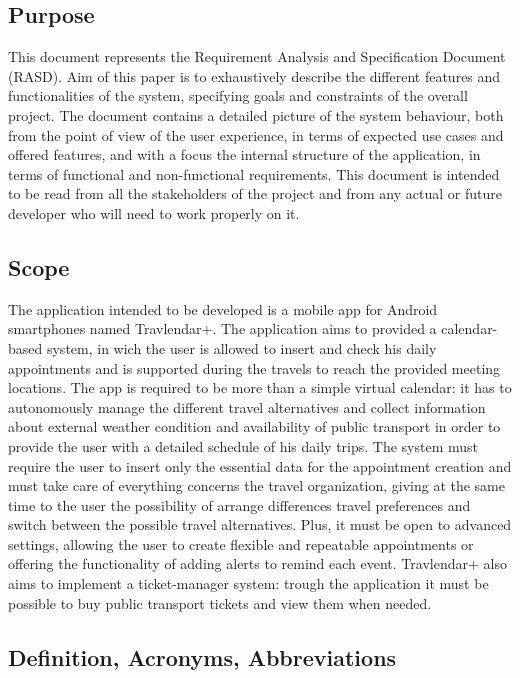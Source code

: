 \subsection{Purpose}
This document represents the Requirement Analysis and Specification Document (RASD). Aim of this paper is to exhaustively describe the different features and functionalities of the system, specifying goals and constraints of the overall project. The document contains a detailed picture of the system behaviour, both from the point of view of the user experience, in terms of expected use cases and offered features, and with a focus the internal structure of the application, in terms of functional and non-functional requirements.
This document is intended to be read from all the stakeholders of the project and from any actual or future developer who will need to work properly on it.

\subsection{Scope}
The application intended to be developed is a mobile app for Android smartphones named Travlendar+. The application aims to provided a calendar-based system, in wich the user is allowed to insert and check his daily appointments and is supported during the travels to reach the provided meeting locations.
The app is required to be more than a simple virtual calendar: it has to autonomously manage the different travel alternatives and collect information about external weather condition and availability of public transport in order to provide the user with a detailed schedule of his daily trips. The system must require the user to insert only the essential data for the appointment creation and must take care of everything concerns the travel organization, giving at the same time to the user the possibility of arrange differences travel preferences and switch between the possible travel alternatives. Plus, it must be open to advanced settings, allowing the user to create flexible and repeatable appointments or offering the functionality of adding alerts to remind each event. 
Travlendar+ also aims to implement a ticket-manager system: trough the application it must be possible to buy public transport tickets and view them when needed.

\subsection{Definition, Acronyms, Abbreviations}
